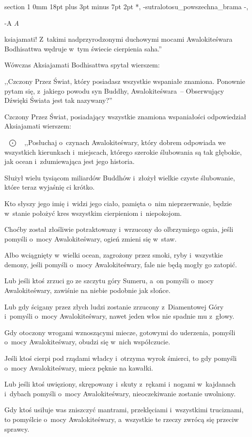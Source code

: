 \documentclass[12pt]{article}
\makeatletter
\renewcommand{\section}{\@startsection%
 {section}			%
 {1}				%
 {0mm}				%
 {18pt plus 3pt minus 7pt}	%
 { 2pt}				%
 {\bfseries}}			%
\newcommand{\keisu}		{\mbox{\ $\bigodot$\ \ }}
\newcounter{labelnum}
\newenvironment{Prayer}[4]{%
	\section*{#2}
	\ifx -#1
		\stepcounter{labelnum}\label{label.\arabic{labelnum}}\nopagebreak
	\else
		\label{#1}\nopagebreak
	\fi
	\ifx -#3
		\addcontentsline{toc}{section}{#2}
	\else
		\addcontentsline{toc}{section}{#3}
	\fi
	\ifx -#4
		{}
	\else
		\noindent\emph{#4}\par\nopagebreak
	\fi
	\begingroup
}
{\par\endgroup}
\makeatother
\begin{document}
\begin{Prayer}{sutralotosu_powszechna_brama}
,,Aksiajamati! Z~takimi nadprzyrodzonymi duchowymi mocami Awalokiteśwara
Bodhisattwa wędruje w~tym świecie cierpienia saha.''


Wówczas Aksiajamati Bodhisattwa spytał wierszem:


,,Czczony Przez Świat, który posiadasz wszystkie wspaniałe znamiona. Ponownie
pytam się, z~jakiego powodu syn Buddhy, Awalokiteśwara~-- Obserwujący Dźwięki
Świata jest tak nazywany?''


Czczony Przez Świat, posiadający wszystkie znamiona wspaniałości odpowiedział
Aksiajamati wierszem:


\keisu ,,Posłuchaj o~czynach Awalokiteśwary, który dobrem odpowiada we wszystkich
kierunkach i~miejscach, którego szerokie ślubowania są tak głębokie, jak ocean
i~zdumiewająca jest jego historia.


Służył wielu tysiącom miliardów Buddhów i~złożył wielkie czyste ślubowanie,
które teraz wyjaśnię ci krótko.


Kto słyszy jego imię i~widzi jego ciało, pamięta o~nim nieprzerwanie, będzie
w~stanie położyć kres wszystkim cierpieniom i~niepokojom.


Choćby został złośliwie potraktowany i~wrzucony do olbrzymiego ognia, jeśli
pomyśli o~mocy Awalokiteśwary, ogień zmieni się w~staw.


Albo wciągnięty w~wielki ocean, zagrożony przez smoki, ryby i~wszystkie demony,
jeśli pomyśli o~mocy Awalokiteśwary, fale nie będą mogły go zatopić.


Lub jeśli ktoś zrzuci go ze szczytu góry Sumeru, a~on pomyśli o~mocy
Awalokiteśwary, zawiśnie na niebie podobnie jak słońce.


Lub gdy ścigany przez złych ludzi zostanie zrzucony z~Diamentowej Góry
i~pomyśli o~mocy Awalokiteśwary, nawet jeden włos nie spadnie mu z~głowy.


Gdy otoczony wrogami wznoszącymi miecze, gotowymi do uderzenia, pomyśli o~mocy
Awalokiteśwary, obudzi się w~nich współczucie.


Jeśli ktoś cierpi pod rządami władcy i~otrzyma wyrok śmierci, to gdy pomyśli
o~mocy Awalokiteśwary, miecz pęknie na kawałki.


Lub jeśli ktoś uwięziony, skrępowany i~skuty z~rękami i~nogami w~kajdanach
i~dybach pomyśli o~mocy Awalokiteśwary, nieoczekiwanie zostanie uwolniony.


Gdy ktoś usiłuje was zniszczyć mantrami, przeklęciami i~wszystkimi truciznami,
to pomyślcie o~mocy Awalokiteśwary, a~wszystkie te rzeczy zwrócą się przeciw
sprawcy.



\end{Prayer}
\end{document}
